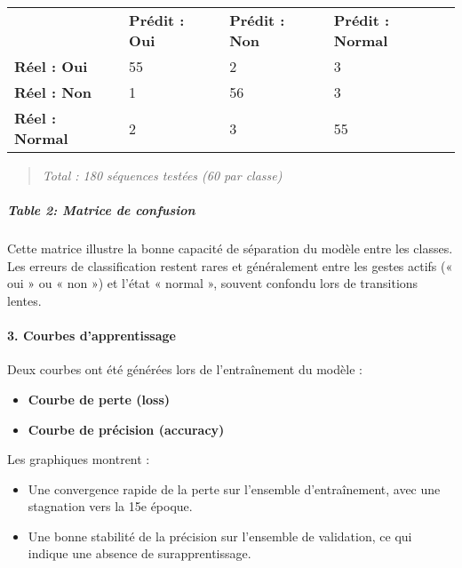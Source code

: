 \documentclass[
]{article}
\begin{document}
\begin{longtable}[]{@{}llll@{}}
\toprule
\endhead
& \textbf{Prédit : Oui} & \textbf{Prédit : Non} & \textbf{Prédit : Normal} \\
\textbf{Réel : Oui} & 55 & 2 & 3 \\
\textbf{Réel : Non} & 1 & 56 & 3 \\
\textbf{Réel : Normal} & 2 & 3 & 55 \\
\bottomrule
\end{longtable}

\begin{quote}
\emph{Total : 180 séquences testées (60 par classe)}
\end{quote}

\hypertarget{table-2-matrice-de-confusion}{%
\subparagraph{Table 2: Matrice de confusion}\label{table-2-matrice-de-confusion}}

Cette matrice illustre la bonne capacité de séparation du modèle entre les classes. Les erreurs de classification restent rares et généralement entre les gestes actifs (« oui » ou « non ») et l'état « normal », souvent confondu lors de transitions lentes.

\hypertarget{courbes-dapprentissage}{%
\paragraph{\texorpdfstring{\textbf{3. Courbes d'apprentissage}}{3. Courbes d'apprentissage}}\label{courbes-dapprentissage}}

Deux courbes ont été générées lors de l'entraînement du modèle :

\begin{itemize}
\item
  \textbf{Courbe de perte (loss)\\
  }
\item
  \textbf{Courbe de précision (accuracy)\\
  }
\end{itemize}

Les graphiques montrent :

\begin{itemize}
\item
  Une convergence rapide de la perte sur l'ensemble d'entraînement, avec une stagnation vers la 15e époque.
\item
  Une bonne stabilité de la précision sur l'ensemble de validation, ce qui indique une absence de surapprentissage.
\end{itemize}
\end{document}
